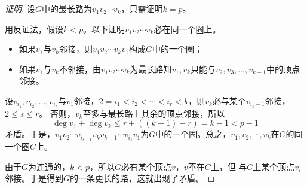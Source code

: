   \begin{proof}[证明]
    设$G$中的最长路为$v_1v_2\cdots v_k$，只需证明$k = p$。

    用反证法，假设$k < p$。以下证明$v_1v_2\cdots v_k$必在同一个圈上。
    \begin{itemize}
    \item 如果$v_1$与$v_k$邻接，则$v_1v_2\cdots v_kv_1$构成$G$中的一个圈；
    \item 如果$v_1$与$v_k$不邻接，由$v_1v_2\cdots v_k$为最长路知$v_1,v_k$只能与$v_2,v_3,\ldots,v_{k-1}$中的顶点邻接。
    \end{itemize}
    
   设$v_{i_1},v_{i_2},\ldots,v_{i_r}$与$v_1$邻接，$2=i_1 < i_2 < \cdots < i_r < k$，则$v_k$必与某个$v_{i_s-1}$邻接，$2\leq s \leq r$。
      否则，$v_k$至多与最长路上其余的顶点邻接，所以
      \[\deg v_1 + \deg v_k \leq r + ((k-1) - r) = k - 1 < p - 1\]
      矛盾。于是，$v_1v_2\cdots v_{i_{s-1}}v_kv_{k-1}\cdots v_{i_s}v_1$为$G$中的一个圈。总之，$v_1,v_2,\cdots,v_k$在$G$的同一个圈$C$上。

          由于$G$为连通的，$k < p$，所以$G$必有某个顶点$v$，$v$不在$C$上，但
    与$C$上某个顶点$v_i$邻接。于是得到$G$的一条更长的路，这就出现了矛盾。
\end{proof}

